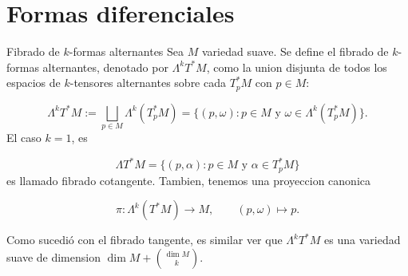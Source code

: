 \chapter{Formas diferenciales}
\label{ch:teo-21}
\begin{bookdefinition}{Fibrado de $k$-formas alternantes}
Sea $M$ variedad suave. Se define el fibrado de $k$-formas alternantes, denotado por $\Lambda^kT^*M$, como la union disjunta de todos los espacios de $k$-tensores alternantes sobre cada $T_p^{*}M$ con $p\in M$:

\[
\Lambda^kT^*M:=\bigsqcup_{p\in M}\Lambda^k(T_p^*M)=\{(p,\omega):p\in M\text{ y }\omega\in\Lambda^k(T_p^*M)\}.
\]
El caso $k=1$, es

\[
\Lambda T^*M=\{(p,\alpha):p\in M\text{ y }\alpha\in T_p^*M\}
\]
es llamado fibrado cotangente. Tambien, tenemos una proyeccion canonica

\[
\pi:\Lambda^k(T^*M)\to M,\qquad (p,\omega)\mapsto p.
\]
\end{bookdefinition}
\begin{bookremark}{}
Como sucedió con el fibrado tangente, es similar ver que $\Lambda^kT^*M$ es una variedad suave de dimension $\dim M+\binom{\dim M}{k}$.

\end{bookremark}
